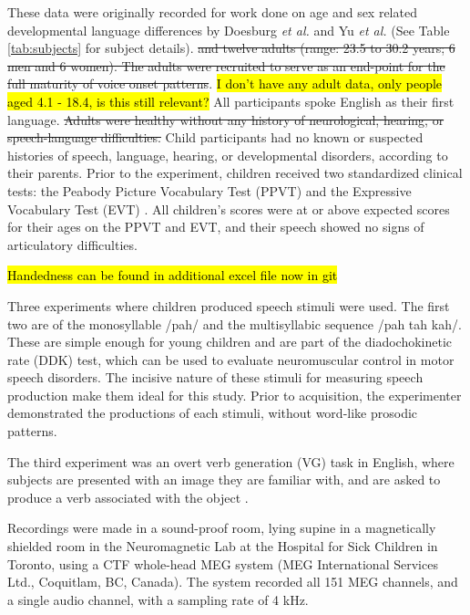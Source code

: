 \documentclass[a4paper]{article}
\newcommand{\DK}[1]{{\small \textcolor{blue}{\hl{#1}}}}
\begin{document}
These data were originally recorded for work done on age and sex related developmental language differences by Doesburg \emph{et al.} and Yu \emph{et al.} \cite{Doesburg2016, Yu2014} (See Table \ref{tab:subjects} for subject details). \st{and twelve adults (range: 23.5 to 30.2 years; 6 men and 6 women). The adults were recruited to serve as an end-point for the full maturity of voice onset patterns}. \DK{I don't have any adult data, only people aged 4.1 - 18.4, is this still relevant?} All participants spoke English as their first language. \st{Adults were healthy without any history of neurological, hearing, or speech-language difficulties.} Child participants had no known or suspected histories of speech, language, hearing, or developmental disorders, according to their parents. Prior to the experiment, children received two standardized clinical tests: the Peabody Picture Vocabulary Test (PPVT) \cite{Dunn97} and the Expressive Vocabulary Test (EVT) \cite{EVT}. All children's scores were at or above expected scores for their ages on the PPVT and EVT, and their speech showed no signs of articulatory difficulties.

\DK{Handedness can be found in additional excel file now in git}

Three experiments where children produced speech stimuli were used. The first two are of the monosyllable /pah/ and the multisyllabic sequence /pah tah kah/. These are simple enough for young children and are part of the diadochokinetic rate (DDK) test, which can be used to evaluate neuromuscular control in motor speech disorders. The incisive nature of these stimuli for measuring speech production make them ideal for this study. Prior to acquisition, the experimenter demonstrated the productions of each stimuli, without word-like prosodic patterns.

The third experiment was an overt verb generation (VG) task in English, where subjects are presented with an image they are familiar with, and are asked to produce a verb associated with the object \cite{Doesburg2016}.

Recordings were made in a sound-proof room, lying supine in a magnetically shielded room in the Neuromagnetic Lab at the Hospital for Sick Children in Toronto, using a CTF whole-head MEG system (MEG International Services Ltd., Coquitlam, BC, Canada). The system recorded all 151 MEG channels, and a single audio channel, with a sampling rate of 4 kHz. %
\end{document}
